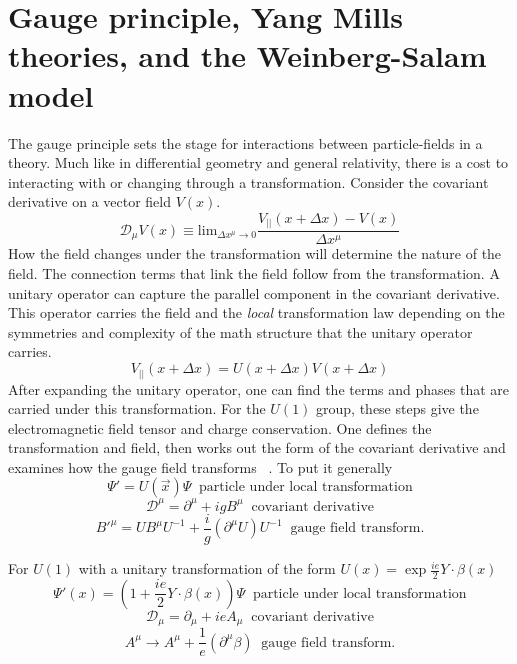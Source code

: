 \section{Gauge principle, Yang Mills theories, and the Weinberg-Salam model}
The gauge principle sets the stage for interactions between particle-fields in a theory. Much like in differential geometry and general relativity, there is a cost to interacting with or changing through a transformation. Consider the covariant derivative on a vector field $V(x)$.
\begin{equation}\mathcal{D}_\mu V(x) \equiv \text{lim}_{\Delta x^{\mu} \rightarrow 0 } \frac{V_{||}(x+\Delta x) - V(x)}{\Delta x^{\mu}} \end{equation} 
How the field changes under the transformation will determine the nature of the field. The connection terms that link the field follow from the transformation. A unitary operator can capture the parallel component in the covariant derivative. This operator carries the field and the \textit{local} transformation law depending on the symmetries and complexity of the math structure that the unitary operator carries. 
\begin{equation}V_{||}(x+\Delta x) = U(x+\Delta x)V(x+\Delta x)\end{equation}
After expanding the unitary operator, one can find the terms and phases that are carried under this transformation. 
For the $U(1)$ group, these steps give the electromagnetic field tensor and charge conservation. 
One defines the transformation and field, then works out the form of the covariant derivative and examines how the gauge field transforms ~\cite{Tully:1417476}. To put it generally
\begin{equation}
\label{eq:lt}
\Psi'= U(\overrightarrow{x})\Psi \;\;\text{particle under local transformation}\end{equation}
\begin{equation}
\label{eq:cd}
\mathcal{D}^\mu = \partial^\mu + igB^\mu \;\;\text{covariant derivative}
\end{equation}
\begin{equation}
\label{eq:gt}
B'^\mu = UB^\mu U^{-1} + \frac{i}{g}(\partial^\mu U)U^{-1} \;\;\text{gauge field transform.} 
\end{equation} 

For $U(1)$ with a unitary transformation of the form $U(x) = \exp{\frac{ie}{2}Y\cdot\beta(x)}$ 
\begin{equation}\Psi'(x)= (1+\frac{ie}{2}Y\cdot\beta(x))\Psi \;\;\text{particle under local transformation}\end{equation}
\begin{equation}\mathcal{D}_\mu = \partial_\mu + ieA_\mu \;\;\text{covariant derivative}\end{equation}
\begin{equation}A^\mu \rightarrow A^\mu + \frac{1}{e}(\partial^\mu \beta) \;\;\text{gauge field transform.} \end{equation} 


